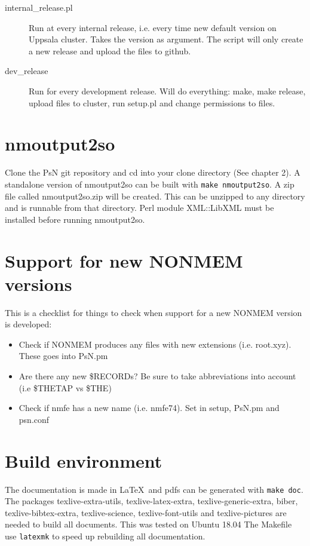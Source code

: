 \begin{description}
\item[internal\_release.pl] Run at every internal release, i.e. every time new default
version on Uppsala cluster. Takes the version as argument. The script will only create
a new release and upload the files to github.
\item[dev\_release] Run for every development release. Will do everything: make, make release,
    upload files to cluster, run setup.pl and change permissions to files.
\end{description}

\section{nmoutput2so}
Clone the PsN git repository and cd into your clone directory (See chapter 2). A standalone version of nmoutput2so can be built with \verb|make nmoutput2so|. A zip file called nmoutput2so.zip will be created. This can be unzipped
to any directory and is runnable from that directory.
Perl module XML::LibXML must be installed before running nmoutput2so.

\section{Support for new NONMEM versions}
This is a checklist for things to check when support for a new NONMEM version is developed:
\begin{itemize}
    \item Check if NONMEM produces any files with new extensions (i.e. root.xyz). These goes into PsN.pm
    \item Are there any new \$RECORDs? Be sure to take abbreviations into account (i.e \$THETAP vs \$THE)
    \item Check if nmfe has a new name (i.e. nmfe74). Set in setup, PsN.pm and psn.conf
\end{itemize}


\section{Build environment}
The documentation is made in \LaTeX\ and pdfs can be generated with \verb|make doc|. The
packages texlive-extra-utils, texlive-latex-extra, texlive-generic-extra, biber, texlive-bibtex-extra, texlive-science, texlive-font-utils and texlive-pictures are needed to build all documents. This was tested on Ubuntu 18.04
The Makefile use \verb|latexmk| to speed up rebuilding all documentation.

